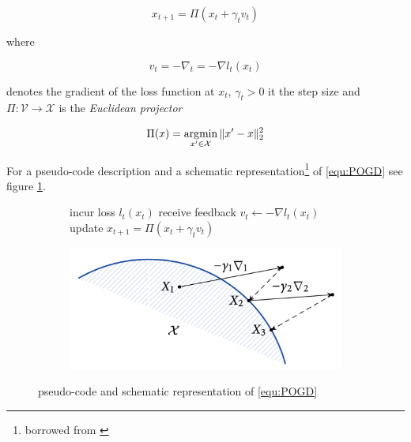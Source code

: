 \begin{equation}
   \tag{POGD}
        x_{t+1} = \Pi(x_t + \gamma_t v_t)
   \label{equ:POGD}
\end{equation}

where

\begin{equation}
    v_t = -\nabla_t = -\nabla l_t(x_t)
    \label{equ:gradient}
\end{equation}

denotes the gradient of the loss function at $x_t$, $\gamma_t > 0 $ it the step size and $\Pi: \mathcal{V} \to \mathcal{X}$ is the \textit{Euclidean projector} 

\begin{equation*}
    \Pi(x) = \operatorname*{\arg\!\min}_{x'\in \mathcal{X}}\|x'-x\|_2^{2}
\end{equation*}

For a pseudo-code description and a schematic representation\footnote{borrowed from \cite[Chapter 2]{HDRmertikopoulos}} of \ref{equ:POGD} see figure \ref{fig:POGDpseudoCodeAndScheme}.

\begin{figure}[H]
\centering
\begin{subfigure}{.5\textwidth}
    \begin{algorithm}[H]
    \DontPrintSemicolon
     {
    incur loss $l_t(x_t)$ \;
    receive feedback $v_t \gets -\nabla l_t(x_t)$ \;
    update $x_{t+1} = \Pi(x_t + \gamma_t v_t)$ \;
    }
    \end{algorithm}
\end{subfigure}%
\begin{subfigure}{.5\textwidth}
  \centering
  \includegraphics[width=\textwidth]{logos/POGDscheme.png}
\end{subfigure}
\caption{pseudo-code and schematic representation of \ref{equ:POGD}}
\label{fig:POGDpseudoCodeAndScheme}
\end{figure}

